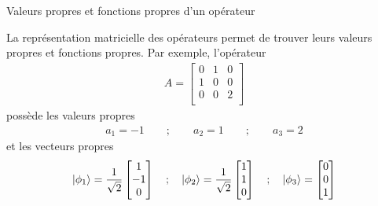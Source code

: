 \documentclass[xcolor=svgnames,t,aspectratio=169,handout]{uqtrcours}
\begin{document}
\begin{frame}{Valeurs propres et fonctions propres d'un opérateur}

La représentation matricielle des opérateurs permet de trouver
  leurs valeurs propres et fonctions propres.
Par exemple, l'opérateur
\begin{align}
  A =
  \begin{bmatrix}
    0 & 1 & 0 \\
    1 & 0 & 0 \\
    0 & 0 & 2 \\
  \end{bmatrix}
\end{align}
possède les valeurs propres
\begin{align}
  a_1 = -1
  \qquad ; \qquad
  a_2 =  1
  \qquad ; \qquad
  a_3 =  2
\end{align}
et les vecteurs propres
\begin{align}
  \ket{\phi_1} =
  \frac{1}{\sqrt{2}}
  \begin{bmatrix}
    1 \\
    -1 \\
    0 \\
  \end{bmatrix}
  \quad ; \quad
  \ket{\phi_2} =
  \frac{1}{\sqrt{2}}
  \begin{bmatrix}
    1 \\
    1 \\
    0 \\
  \end{bmatrix}
  \quad ; \quad
  \ket{\phi_3} =
  \begin{bmatrix}
    0 \\
    0 \\
    1 \\
  \end{bmatrix}
\end{align}

\end{frame}
\end{document}
